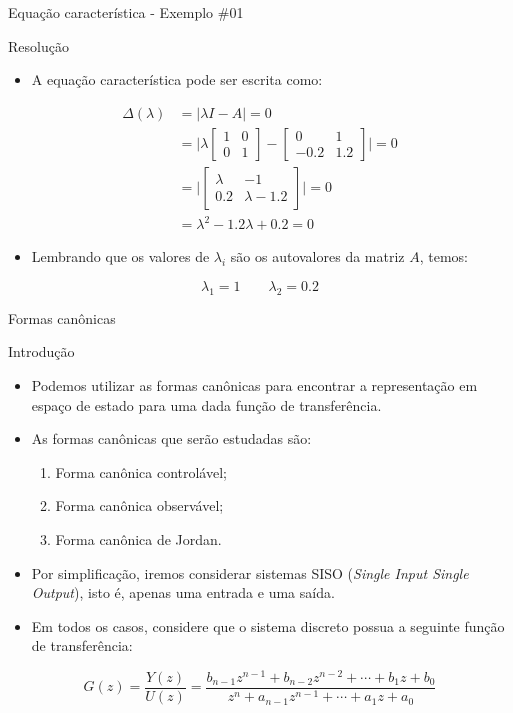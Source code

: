 \begin{frame}{Equação característica - Exemplo \#01}
\begin{block}{Resolução}
\begin{itemize}
    \item A equação característica pode ser escrita como:
\end{itemize}

\begin{align*}
    \Delta(\lambda) &= |\lambda I - A| =  0 \\
    &= \Bigg|\lambda \begin{bmatrix}
    1 & 0 \\ 0 & 1 \end{bmatrix} - \begin{bmatrix}
    0 & 1 \\ -\num{0,2} & \num{1,2}
    \end{bmatrix}\Bigg| = 0 \\
    &= \Bigg|\begin{bmatrix}
    \lambda & -\num{1} \\ \num{0,2} & \lambda-\num{1,2} \end{bmatrix}\Bigg| = 0 \\
    &= \lambda^2 -\num{1,2}\lambda + \num{0,2} = 0
\end{align*}
\begin{itemize}
    \item Lembrando que os valores de $\lambda_i$ são os autovalores da matriz $A$, temos:
\end{itemize}
$$\lambda_1 = 1 \qquad \lambda_2 = \num{0,2}$$
\end{block}
\end{frame}

\begin{frame}{Formas canônicas}
\begin{block}{Introdução}
\begin{itemize}
    \item Podemos utilizar as formas canônicas para encontrar a representação em espaço de estado para uma dada função de transferência.
    \item As formas canônicas que serão estudadas são:
    \begin{enumerate}
        \item Forma canônica controlável;
        \item Forma canônica observável;
        \item Forma canônica de Jordan.
    \end{enumerate}
    \item Por simplificação, iremos considerar sistemas SISO (\textit{Single Input Single Output}), isto é, apenas uma entrada e uma saída.
    \item Em todos os casos, considere que o sistema discreto possua a seguinte função de transferência:
\end{itemize}
$$G(z) = \dfrac{Y(z)}{U(z)} = \dfrac{b_{n-1}z^{n-1}+b_{n-2}z^{n-2} + \cdots + b_1z+b_0}{z^n+a_{n-1}z^{n-1}+ \cdots + a_1z+a_0}$$
\end{block}
\end{frame}

